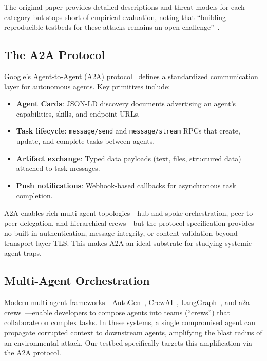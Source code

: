 The original paper provides detailed descriptions and threat models
for each category but stops short of empirical evaluation, noting that
``building reproducible testbeds for these attacks remains an open
challenge''~\cite{yuntao2025agenttraps}.

\subsection{The A2A Protocol}
\label{sec:bg-a2a}

Google's Agent-to-Agent (A2A) protocol~\cite{google2025a2a} defines
a standardized communication layer for autonomous agents. Key
primitives include:

\begin{itemize}[nosep,leftmargin=*]
  \item \textbf{Agent Cards}: JSON-LD discovery documents advertising
    an agent's capabilities, skills, and endpoint URLs.
  \item \textbf{Task lifecycle}: \texttt{message/send} and
    \texttt{message/stream} RPCs that create, update, and complete
    tasks between agents.
  \item \textbf{Artifact exchange}: Typed data payloads (text, files,
    structured data) attached to task messages.
  \item \textbf{Push notifications}: Webhook-based callbacks for
    asynchronous task completion.
\end{itemize}

A2A enables rich multi-agent topologies---hub-and-spoke orchestration,
peer-to-peer delegation, and hierarchical crews---but the protocol
specification provides no built-in authentication, message integrity,
or content validation beyond transport-layer TLS. This makes A2A an
ideal substrate for studying systemic agent traps.

\subsection{Multi-Agent Orchestration}
\label{sec:bg-orchestration}

Modern multi-agent frameworks---AutoGen~\cite{wu2023autogen},
CrewAI~\cite{crewai2024}, LangGraph~\cite{langgraph2024}, and
a2a-crews~\cite{dua2026a2acrews}---enable developers to compose
agents into teams (``crews'') that collaborate on complex tasks.
In these systems, a single compromised agent can propagate corrupted
context to downstream agents, amplifying the blast radius of an
environmental attack. Our testbed specifically targets this
amplification via the A2A protocol.
